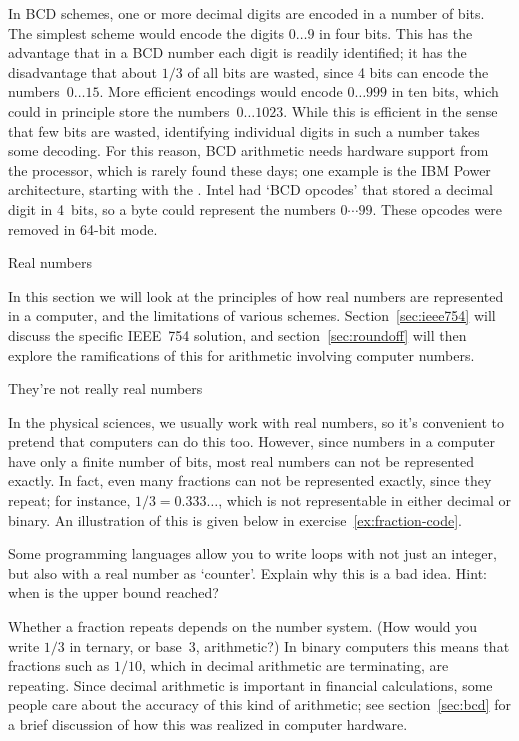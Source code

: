 In BCD schemes, one or more decimal digits are encoded in a number of
bits. The simplest scheme would encode the digits $0\ldots9$ in four
bits. This has the advantage that in a
BCD number each digit is readily identified; it has the disadvantage
that about $1/3$ of all bits are wasted, since 4 bits can
encode the numbers~$0\ldots15$.
%
More efficient encodings would encode $0\ldots999$ in ten bits, which
could in principle store the numbers~$0\ldots1023$. While this is
efficient in the sense that few bits are wasted, identifying
individual digits in such a number takes some decoding. For this
reason, BCD arithmetic needs hardware support from the processor,
which is rarely found these days; one example is the IBM
Power architecture, starting with the .
Intel had `BCD opcodes' that stored a decimal digit in 4~bits,
so a byte could represent the numbers $0\cdots 99$.
These opcodes were removed in 64-bit mode.

 {Real numbers}
\label{sec:real-numbers}

In this section we will look at the principles of how real numbers are
represented in a computer, and the limitations of various schemes.
Section~\ref{sec:ieee754} will discuss the specific IEEE~754
solution, and
section~\ref{sec:roundoff} will then explore the ramifications of this for arithmetic
involving computer numbers.

 {They're not really real numbers}
\label{sec:arith-intro}

In the physical sciences, we usually work with real numbers, so
it's convenient to pretend that computers can do this too. However,
since numbers in a computer have only a finite number of bits, most
real numbers can not be represented exactly. In fact, even many
fractions can not be represented exactly, since they repeat; for
instance, $1/3=0.333\ldots$, which is not representable in either
decimal or binary.
An illustration of this is given below
in exercise~\ref{ex:fraction-code}.

\begin{exercise}
  Some programming languages allow you to write loops with not just an
  integer, but also with a real number as `counter'. Explain why this
  is a bad idea. Hint: when is the upper bound reached?
\end{exercise}

Whether a fraction repeats depends on the number system. (How would
you write $1/3$ in ternary, or base~3, arithmetic?) In binary computers
this means that fractions such as $1/10$, which in decimal arithmetic
are terminating, are repeating. Since decimal arithmetic is important
in financial calculations, some
people care about the accuracy of this kind of arithmetic;
see section~\ref{sec:bcd} for a brief discussion
of how this was realized in computer hardware.

